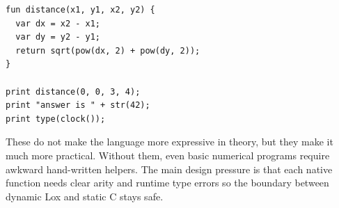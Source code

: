\documentclass{article}
\begin{document}
\begin{enumerate}
{        \begin{verbatim}
fun distance(x1, y1, x2, y2) {
  var dx = x2 - x1;
  var dy = y2 - y1;
  return sqrt(pow(dx, 2) + pow(dy, 2));
}

print distance(0, 0, 3, 4);
print "answer is " + str(42);
print type(clock());
        \end{verbatim}

        These do not make the language more expressive in theory, but they make it much
        more practical. Without them, even basic numerical programs require awkward
        hand-written helpers. The main design pressure is that each native function
        needs clear arity and runtime type errors so the boundary between dynamic Lox
        and static C stays safe.
    }
\end{enumerate}
\end{document}

